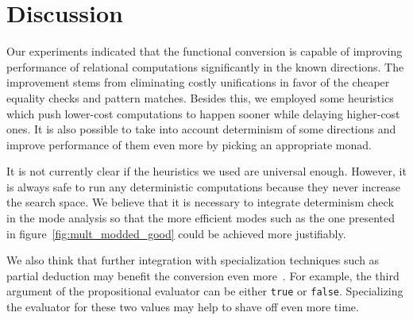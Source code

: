 \section{Discussion}
\label{sec:discussion}

Our experiments indicated that the functional conversion is capable of improving performance of relational computations significantly in the known directions.
The improvement stems from eliminating costly unifications in favor of the cheaper equality checks and pattern matches.
Besides this, we employed some heuristics which push lower-cost computations to happen sooner while delaying higher-cost ones.
It is also possible to take into account determinism of some directions and improve performance of them even more by picking an appropriate monad.

It is not currently clear if the heuristics we used are universal enough.
However, it is always safe to run any deterministic computations because they never increase the search space.
We believe that it is necessary to integrate determinism check in the mode analysis so that the more efficient modes such as the one presented in figure~\ref{fig:mult_modded_good} could be achieved more justifiably.

We also think that further integration with specialization techniques such as partial deduction may benefit the conversion even more~\cite{verbitskaia2021empirical}.
For example, the third argument of the propositional evaluator can be either \lstinline{true} or \lstinline{false}.
Specializing the evaluator for these two values may help to shave off even more time.
